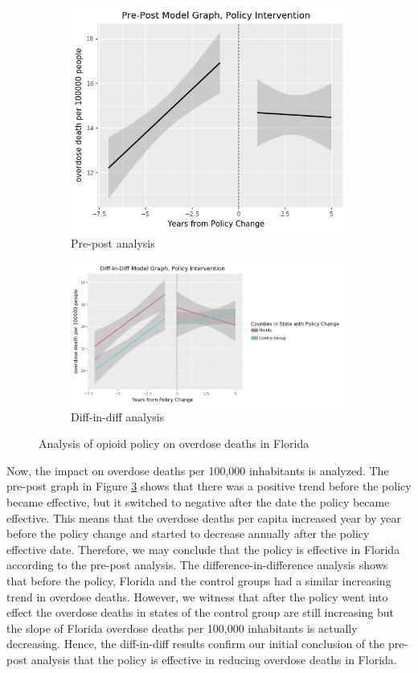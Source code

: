 \documentclass[12pt,letterpaper]{article}
\begin{document}
\begin{figure}[!h]
\centering
\begin{subfigure}{.5\textwidth}
  \centering
  \includegraphics[width=0.7\linewidth]{../30_results/General_Results/florida_overdose_death_prepost.png}
  \caption{Pre-post analysis}
  \label{fig:fl_death_prepost}
\end{subfigure}%
\begin{subfigure}{.55\textwidth}
  \centering
  \includegraphics[width=1\linewidth]{../30_results/General_Results/florida_overdose_death_diffdiff.png}
  \caption{Diff-in-diff analysis}
  \label{fig:fl_death_did}
\end{subfigure}
\caption{Analysis of opioid policy on overdose deaths in Florida}
\label{fig:fl_death}
\end{figure}


Now, the impact on overdose deaths per 100,000 inhabitants is analyzed. The pre-post graph in Figure \ref{fig:fl_death} shows that there was a positive trend before the policy became effective, but it switched to negative after the date the policy became effective. This means that the overdose deaths per capita increased year by year before the policy change and started to decrease annually after the policy effective date. Therefore, we may conclude that the policy is effective in Florida according to the pre-post analysis. The difference-in-difference analysis shows that before the policy, Florida and the control groups had a similar increasing trend in overdose deaths. However, we witness that after the policy went into effect the overdose deaths in states of the control group are still increasing but the slope of Florida overdose deaths per 100,000 inhabitants is actually decreasing. Hence, the diff-in-diff results confirm our initial conclusion of the pre-post analysis that the policy is effective in reducing overdose deaths in Florida.
\end{document}
